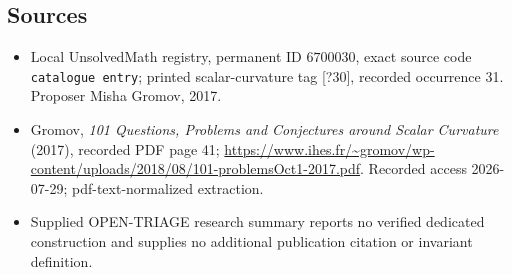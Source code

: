 \documentclass[11pt]{article}
\begin{document}
\subsection{Sources}
\begin{itemize}
\item Local UnsolvedMath registry, permanent ID \(6700030\), exact source code \texttt{catalogue entry}; printed scalar-curvature tag [?30], recorded occurrence 31. Proposer Misha Gromov, 2017.
\item Gromov, \emph{101 Questions, Problems and Conjectures around Scalar Curvature} (2017), recorded PDF page 41; \url{https://www.ihes.fr/~gromov/wp-content/uploads/2018/08/101-problemsOct1-2017.pdf}. Recorded access 2026-07-29; pdf-text-normalized extraction.
\item Supplied OPEN-TRIAGE research summary reports no verified dedicated construction and supplies no additional publication citation or invariant definition.
\end{itemize}
\end{document}
